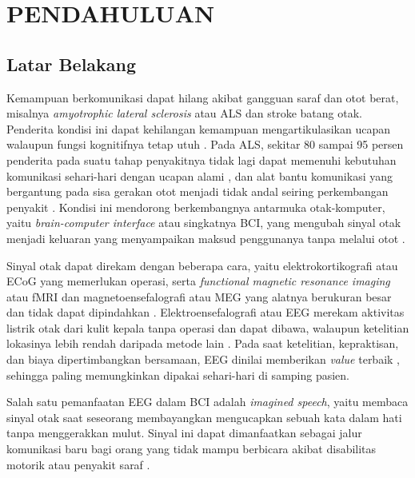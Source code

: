 \cleardoublepage %
\chapter{PENDAHULUAN}
\label{chap:pendahuluan}


\section{Latar Belakang}
\label{sec:latar-belakang}
Kemampuan berkomunikasi dapat hilang akibat gangguan saraf dan otot berat, misalnya \textit{amyotrophic lateral sclerosis} atau ALS dan stroke batang otak.
Penderita kondisi ini dapat kehilangan kemampuan mengartikulasikan ucapan walaupun fungsi kognitifnya tetap utuh \parencite[lihat Subbab~\ref{sec:bci}]{moses2021,he2026}.
Pada ALS, sekitar 80 sampai 95 persen penderita pada suatu tahap penyakitnya tidak lagi dapat memenuhi kebutuhan komunikasi sehari-hari dengan ucapan alami \parencite{beukelman2011}, dan alat bantu komunikasi yang bergantung pada sisa gerakan otot menjadi tidak andal seiring perkembangan penyakit \parencite{canny2023}.
Kondisi ini mendorong berkembangnya antarmuka otak-komputer, yaitu \textit{brain-computer interface} atau singkatnya BCI, yang mengubah sinyal otak menjadi keluaran yang menyampaikan maksud penggunanya tanpa melalui otot \parencite[lihat Subbab~\ref{sec:bci}]{shih2012}.

Sinyal otak dapat direkam dengan beberapa cara, yaitu elektrokortikografi atau ECoG yang memerlukan operasi, serta \textit{functional magnetic resonance imaging} atau fMRI dan magnetoensefalografi atau MEG yang alatnya berukuran besar dan tidak dapat dipindahkan \parencite[lihat Subbab~\ref{sec:alur-bci}]{nicolasalonso2012}.
Elektroensefalografi atau EEG merekam aktivitas listrik otak dari kulit kepala tanpa operasi dan dapat dibawa, walaupun ketelitian lokasinya lebih rendah daripada metode lain \parencite{nicolasalonso2012}.
Pada saat ketelitian, kepraktisan, dan biaya dipertimbangkan bersamaan, EEG dinilai memberikan \textit{value} terbaik \parencite{frey2014}, sehingga paling memungkinkan dipakai sehari-hari di samping pasien.

Salah satu pemanfaatan EEG dalam BCI adalah \textit{imagined speech}, yaitu membaca sinyal otak saat seseorang membayangkan mengucapkan sebuah kata dalam hati tanpa menggerakkan mulut.
Sinyal ini dapat dimanfaatkan sebagai jalur komunikasi baru bagi orang yang tidak mampu berbicara akibat disabilitas motorik atau penyakit saraf \parencite[lihat Subbab~\ref{sec:imagined-speech}]{lopezbernal2022}.

